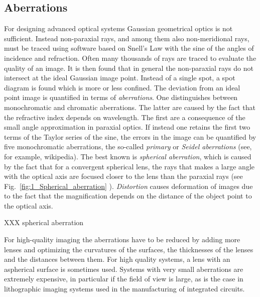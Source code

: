 \subsection{Aberrations}
For designing advanced optical systems Gaussian geometrical optics is not sufficient. 
Instead non-paraxial rays, and among them also non-meridional rays, must be traced  using software based on Snell's Law with the sine of the angles of incidence and refraction. Often many thousands of rays are  traced to evaluate the quality of an image. 
It is then found that in general the non-paraxial rays do not intersect at the ideal Gaussian image point. Instead of a single spot, a spot diagram is found which is more or less confined. The deviation from an ideal point image  is quantified in terms of  \emph{aberrations}. One distinguishes between monochromatic and chromatic aberrations. The latter are caused by the fact that the refractive index depends on wavelength. The first are a consequence of the small angle approximation in paraxial optics. If instead one retains the first two terms of the Taylor series of the sine,  the errors in the image can be quantified by  five monochromatic aberrations, the so-called \emph{primary} or \emph{Seidel aberrations} (see, for example, wikipedia). The best known  is \emph{spherical aberration}, which is caused by the fact that for a convergent spherical lens, the rays that makes a large angle with the optical axis are focused closer to the lens than the paraxial rays (see Fig.~\ref{fig:1_Spherical_aberration}
). \emph{Distortion} causes deformation of images due to the fact that the magnification depends on the distance of the object point to the optical axis.



\begin{marginfigure}
   \caption{XXX spherical aberration}
\label{fig:1_Spherical_aberration}
\end{marginfigure}



For high-quality imaging the aberrations have to be reduced by adding more lenses and optimizing  the curvatures of the surfaces, the thicknesses of the lenses and  the distances between them. For high quality systems,  a lens with an aspherical surface is sometimes used.  Systems with very small aberrations are extremely expensive, in particular if the field of view is large, as is the case in  lithographic imaging systems used in the manufacturing of integrated circuits.




